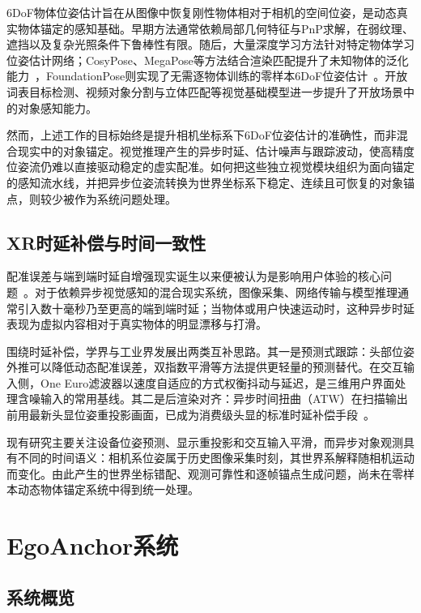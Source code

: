 \documentclass[review]{vgtc}
\begin{document}
6DoF物体位姿估计旨在从图像中恢复刚性物体相对于相机的空间位姿，是动态真实物体锚定的感知基础。早期方法通常依赖局部几何特征与PnP求解，在弱纹理、遮挡以及复杂光照条件下鲁棒性有限。随后，大量深度学习方法针对特定物体学习位姿估计网络；CosyPose、MegaPose等方法结合渲染匹配提升了未知物体的泛化能力~\cite{cosypose2020,megapose2022}，FoundationPose则实现了无需逐物体训练的零样本6DoF位姿估计~\cite{foundationpose2023}。开放词表目标检测、视频对象分割与立体匹配等视觉基础模型进一步提升了开放场景中的对象感知能力。

然而，上述工作的目标始终是提升相机坐标系下6DoF位姿估计的准确性，而非混合现实中的对象锚定。视觉推理产生的异步时延、估计噪声与跟踪波动，使高精度位姿流仍难以直接驱动稳定的虚实配准。如何把这些独立视觉模块组织为面向锚定的感知流水线，并把异步位姿流转换为世界坐标系下稳定、连续且可恢复的对象锚点，则较少被作为系统问题处理。

\subsection{XR时延补偿与时间一致性}

配准误差与端到端时延自增强现实诞生以来便被认为是影响用户体验的核心问题~\cite{azuma1994improving,diluca2010latency}。对于依赖异步视觉感知的混合现实系统，图像采集、网络传输与模型推理通常引入数十毫秒乃至更高的端到端时延；当物体或用户快速运动时，这种异步时延表现为虚拟内容相对于真实物体的明显漂移与打滑。

围绕时延补偿，学界与工业界发展出两类互补思路。其一是预测式跟踪：头部位姿外推可以降低动态配准误差，双指数平滑等方法提供更轻量的预测替代。在交互输入侧，One Euro滤波器以速度自适应的方式权衡抖动与延迟，是三维用户界面处理含噪输入的常用基线。其二是后渲染对齐：异步时间扭曲（ATW）在扫描输出前用最新头显位姿重投影画面，已成为消费级头显的标准时延补偿手段~\cite{vanwaveren2016atw}。

现有研究主要关注设备位姿预测、显示重投影和交互输入平滑，而异步对象观测具有不同的时间语义：相机系位姿属于历史图像采集时刻，其世界系解释随相机运动而变化。由此产生的世界坐标错配、观测可靠性和逐帧锚点生成问题，尚未在零样本动态物体锚定系统中得到统一处理。

\section{EgoAnchor系统}\label{sec:system}

\subsection{系统概览}
\end{document}
